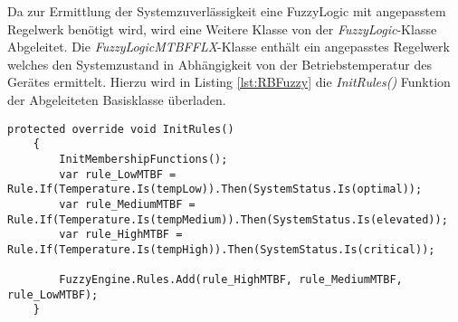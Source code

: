 Da zur Ermittlung der Systemzuverlässigkeit eine FuzzyLogic mit angepasstem Regelwerk benötigt wird, wird eine Weitere Klasse von der \textit{FuzzyLogic}-Klasse Abgeleitet. Die \textit{FuzzyLogicMTBFFLX}-Klasse enthält ein angepasstes Regelwerk welches den Systemzustand in Abhängigkeit von der Betriebstemperatur des Gerätes ermittelt. Hierzu wird in Listing \ref{lst:RBFuzzy} die \textit{InitRules()} Funktion der Abgeleiteten Basisklasse überladen. 
\begin{lstlisting}[caption={Implementierung des Regelwerks}, label={lst:RBFuzzy}]
    protected override void InitRules()
    {
        InitMembershipFunctions();
        var rule_LowMTBF = Rule.If(Temperature.Is(tempLow)).Then(SystemStatus.Is(optimal));
        var rule_MediumMTBF = Rule.If(Temperature.Is(tempMedium)).Then(SystemStatus.Is(elevated));
        var rule_HighMTBF = Rule.If(Temperature.Is(tempHigh)).Then(SystemStatus.Is(critical));

        FuzzyEngine.Rules.Add(rule_HighMTBF, rule_MediumMTBF, rule_LowMTBF);
    }\end{lstlisting}

